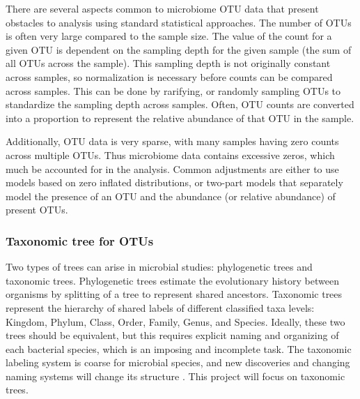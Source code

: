 \documentclass[12pt]{article}
\begin{document}

There are several aspects common to microbiome OTU data that present obstacles to analysis using standard statistical approaches. The number of OTUs is often very large compared to the sample size. The value of the count for a given OTU is dependent on the sampling depth for the given sample (the sum of all OTUs across the sample). This sampling depth is not originally constant across samples, so  normalization is necessary before counts can be compared across samples. This can be done by rarifying, or randomly sampling OTUs to standardize the sampling depth across samples. Often, OTU counts are converted into a proportion to represent the relative abundance of that OTU in the sample.

Additionally, OTU data is very sparse, with many samples having zero counts across multiple OTUs. Thus microbiome data contains excessive zeros, which much be accounted for in the analysis. Common adjustments are either to use models based on zero inflated distributions, or two-part models that separately model the presence of an OTU and the abundance (or relative abundance) of present OTUs.





%


\subsubsection{Taxonomic tree for OTUs}

Two types of trees can arise in microbial studies: phylogenetic trees and taxonomic trees. Phylogenetic trees estimate the evolutionary history between organisms by splitting of a tree to represent shared ancestors. Taxonomic trees represent the hierarchy of shared labels of different classified taxa levels: Kingdom, Phylum, Class, Order, Family, Genus, and Species. Ideally, these two trees should be equivalent, but this requires explicit naming and organizing of each bacterial species, which is an imposing and incomplete task. The taxonomic labeling system is coarse for microbial species, and new discoveries and changing naming systems will change its structure \cite{washburne2018methods}. This project will focus on taxonomic trees.
\end{document}
